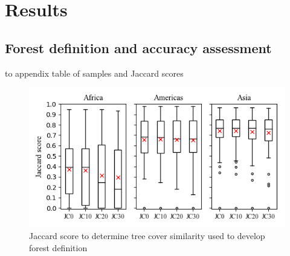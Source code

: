 \section{Results}
\label{sec:result}

\subsection{Forest definition and accuracy assessment}
	{\color{red} to appendix table of samples and Jaccard scores} 

	\begin{figure}[ht]
		\centering
		\includegraphics[scale=1]{img/jaccard}
		\caption[Boxplot of Jaccard scores]{Jaccard score to determine tree cover similarity used to develop forest definition}
		\label{fig:jaccard}
	\end{figure}

